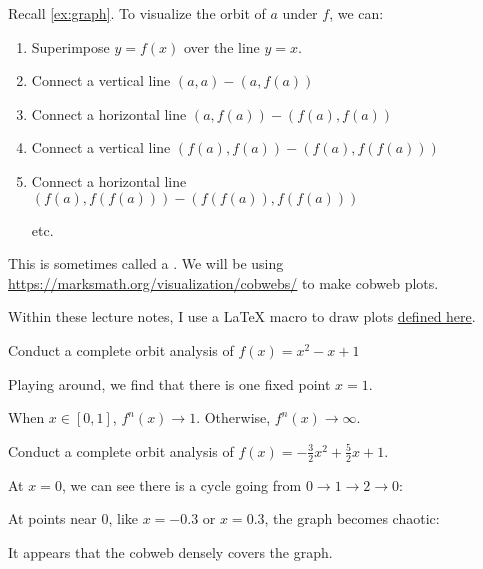 \documentclass[class=pmath370,tikz,notes]{agony}
\begin{document}
Recall \cref{ex:graph}.
To visualize the orbit of $a$ under $f$, we can:
\begin{enumerate}[noitemsep]
  \item Superimpose $y=f(x)$ over the line $y=x$.
  \item Connect a vertical line $(a,a) - (a,f(a))$
  \item Connect a horizontal line $(a,f(a)) - (f(a),f(a))$
  \item Connect a vertical line $(f(a),f(a)) - (f(a), f(f(a)))$
  \item Connect a horizontal line $(f(a), f(f(a))) - (f(f(a)), f(f(a)))$

        etc.
\end{enumerate}
This is sometimes called a .
We will be using \href{https://marksmath.org/visualization/cobwebs/}{https://marksmath.org/visualization/cobwebs/}
to make cobweb plots.

Within these lecture notes, I use a \LaTeX{} macro to draw plots
\href{https://github.com/RetroCraft/problems/blob/master/latex/agony-pmath370.tex}{defined here}.

\begin{example}
  Conduct a complete orbit analysis of $f(x) = x^2 - x + 1$
\end{example}
\begin{sol}
  Playing around, we find that there is one fixed point $x=1$.

  When $x \in [0,1]$, $f^n(x) \to 1$.
  Otherwise, $f^n(x) \to \infty$.
  \begin{center}
    \quad
  \end{center}
\end{sol}


\begin{example}
  Conduct a complete orbit analysis of $f(x) = -\frac32 x^2 + \frac52x + 1$.
\end{example}
\begin{sol}
  At $x = 0$, we can see there is a cycle going from $0 \to 1 \to 2 \to 0$:
  \begin{center}
  \end{center}
  At points near 0, like $x=-0.3$ or $x=0.3$, the graph becomes chaotic:
  \begin{center}
    \quad
  \end{center}
  It appears that the cobweb densely covers the graph.
\end{sol}
\end{document}
